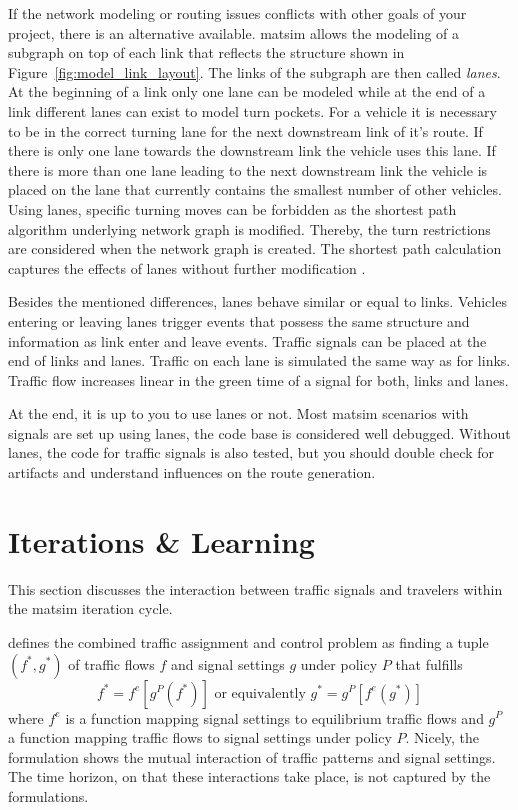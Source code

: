 If the network modeling or routing issues conflicts with other goals of your project, there is an alternative available. 
\gls{matsim} allows the modeling of a subgraph on top of each link that reflects the structure shown in Figure~\ref{fig:model_link_layout}. 
The links of the subgraph are then called \emph{lanes}. 
At the beginning of a link only one lane can be modeled while at the end of a link different lanes can exist to model turn pockets. 
For a vehicle it is necessary to be in the correct turning lane for the next downstream link of it's route. 
If there is only one lane towards the downstream link the vehicle uses this lane. 
If there is more than one lane leading to the next downstream link the vehicle is placed on the lane that currently contains the smallest number of other vehicles.
Using lanes, specific turning moves can be forbidden as the shortest path algorithm underlying network graph is modified.  
Thereby, the turn restrictions are considered when the network graph is created.  
The shortest path calculation captures the effects of lanes without further modification \citep[see][pp.~21]{Grether2014PhD}.  

Besides the mentioned differences, lanes behave similar or equal to links.  
Vehicles entering or leaving lanes trigger events that possess the same structure and information as link enter and leave events.
Traffic signals can be placed at the end of links and lanes. 
Traffic on each lane is simulated the same way as for links. 
Traffic flow increases linear in the green time of a signal for both, links and lanes. 

At the end, it is up to you to use lanes or not. 
Most \gls{matsim} scenarios with signals are set up using lanes, the code base is considered well debugged. 
Without lanes, the code for traffic signals is also tested, but you should double check for artifacts and understand influences on the route generation. 

\section{Iterations \& Learning}
\label{sec:signals_iterations_learning}
This section discusses the interaction between traffic signals and travelers within the \gls{matsim} iteration cycle. 

\citet{Meneguzzer1997ModelReviewTrafficAssignmentSignalControl} defines the combined traffic assignment and control problem as finding a tuple $(f^{*}, g^{*})$ of traffic flows $f$ and signal settings $g$ under policy $P$ that fulfills  
\[
f^{*} = f^{e}[g^{P}(f^{*})] \mbox{  or  equivalently } g^{*} = g^{P}[f^{e}(g^{*})]
\]
where $f^{e}$ is a function mapping signal settings to equilibrium traffic flows and $g^{P}$ a function mapping traffic flows to signal settings under policy $P$.  
Nicely, the formulation shows the mutual interaction of traffic patterns and signal settings.  
The time horizon, on that these interactions take place, is not captured by the formulations. 

